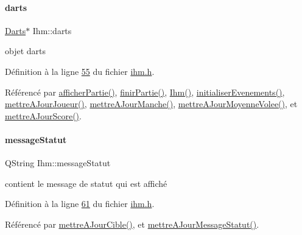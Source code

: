 \mbox{\label{class_ihm_a2a0f54d33f4d6b2531ec2190c4a2356e}} 
\paragraph{\texorpdfstring{darts}{darts}}
{\footnotesize\ttfamily \hyperlink{class_darts}{Darts}$\ast$ Ihm\+::darts\hspace{0.3cm}{\ttfamily [private]}}



objet darts 



Définition à la ligne \hyperlink{ihm_8h_source_l00055}{55} du fichier \hyperlink{ihm_8h_source}{ihm.\+h}.



Référencé par \hyperlink{ihm_8cpp_source_l00333}{afficher\+Partie()}, \hyperlink{ihm_8cpp_source_l00365}{finir\+Partie()}, \hyperlink{ihm_8cpp_source_l00026}{Ihm()}, \hyperlink{ihm_8cpp_source_l00075}{initialiser\+Evenements()}, \hyperlink{ihm_8cpp_source_l00242}{mettre\+A\+Jour\+Joueur()}, \hyperlink{ihm_8cpp_source_l00179}{mettre\+A\+Jour\+Manche()}, \hyperlink{ihm_8cpp_source_l00289}{mettre\+A\+Jour\+Moyenne\+Volee()}, et \hyperlink{ihm_8cpp_source_l00141}{mettre\+A\+Jour\+Score()}.

\mbox{\label{class_ihm_a31a25b36e5560142cb156b8b1a25965f}} 
\paragraph{\texorpdfstring{message\+Statut}{messageStatut}}
{\footnotesize\ttfamily Q\+String Ihm\+::message\+Statut\hspace{0.3cm}{\ttfamily [private]}}



contient le message de statut qui est affiché 



Définition à la ligne \hyperlink{ihm_8h_source_l00061}{61} du fichier \hyperlink{ihm_8h_source}{ihm.\+h}.



Référencé par \hyperlink{ihm_8cpp_source_l00565}{mettre\+A\+Jour\+Cible()}, et \hyperlink{ihm_8cpp_source_l00218}{mettre\+A\+Jour\+Message\+Statut()}.

